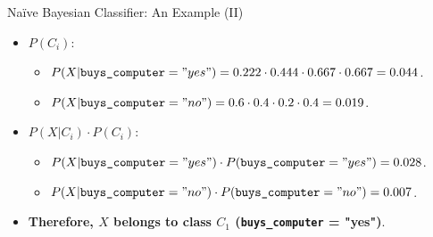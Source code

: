 \begin{frame}{Naïve Bayesian Classifier: An Example (II)}
  \begin{itemize}
  \item $P(C_i)$:
    \begin{itemize}
    \item $P(X | \texttt{buys\_computer} = "yes") = 0.222 \cdot 0.444 \cdot 0.667 \cdot 0.667 = 0.044$.
    \item $P(X | \texttt{buys\_computer} = "no") = 0.6 \cdot 0.4 \cdot 0.2 \cdot 0.4 = 0.019$.
    \end{itemize}
  \item $P(X | C_i) \cdot P(C_i)$:
    \begin{itemize}
    \item $P(X | \texttt{buys\_computer} = "yes") \cdot  P(\texttt{buys\_computer} = "yes") = 0.028$.
    \item $P(X | \texttt{buys\_computer} = "no") \cdot  P(\texttt{buys\_computer} = "no") = 0.007$.
    \end{itemize}
  \item \textbf{Therefore, $X$ belongs to class $C_1$ (\texttt{buys\_computer} = "yes")}.
  \end{itemize}
\end{frame}

